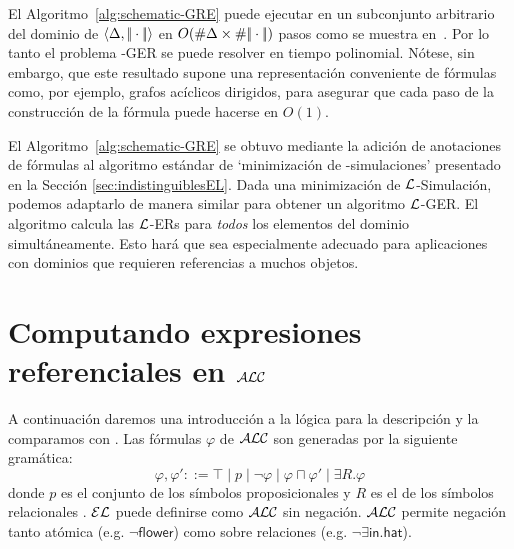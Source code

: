 


El Algoritmo~\ref{alg:schematic-GRE} puede ejecutar en un subconjunto arbitrario del dominio de $\langle \Delta,|\!|\cdot|\!| \rangle$
 en $O(\# \Delta\times\# |\!|\cdot|\!|)$ pasos como se muestra en~\cite{HHK95}. Por lo tanto el problema \EL-GER se puede resolver en tiempo polinomial. N\'otese, sin embargo, que este resultado supone una representaci\'on conveniente de
f\'ormulas como, por ejemplo, grafos ac\'iclicos dirigidos, para asegurar que
cada paso de la construcci\'on de la f\'ormula puede hacerse en $O(1)$. %

El Algoritmo~\ref{alg:schematic-GRE} se obtuvo mediante la adici\'on de anotaciones de f\'ormulas
al algoritmo est\'andar de `minimizaci\'on de \EL-simulaciones' presentado en la Secci\'on \ref{sec:indistinguiblesEL}. Dada una minimizaci\'on de
$\mathcal{L}$-Simulaci\'on, podemos adaptarlo de
manera similar para obtener un algoritmo $\mathcal{L}$-GER.
El algoritmo calcula las $\mathcal{L}$-ERs para \emph{todos} los elementos del
dominio simult\'aneamente.
Esto har\'a que sea especialmente adecuado para aplicaciones con
dominios que requieren referencias a muchos objetos.

\section{Computando expresiones referenciales en $\mathcal{ALC}$}
\label{sec:bisimulacion}

%

A continuaci\'on daremos una introducci\'on a la l\'ogica para la descripci\'on \alc y la comparamos con \el. Las f\'ormulas $\varphi$ de $\mathcal{ALC}$ son generadas por la siguiente gram\'atica:
$$
\varphi,\varphi' ::= \top \mid p \mid \neg \varphi \mid \varphi \sqcap \varphi'
\mid \exists R. \varphi
$$
donde $p$ es el conjunto de los s\'imbolos proposicionales \prop y $R$ es el de los s\'imbolos relacionales \rel. $\mathcal{EL}$ puede definirse como $\mathcal{ALC}$ sin negaci\'on. $\mathcal{ALC}$ permite negaci\'on tanto at\'omica (e.g. $\neg \mathsf{flower}$) como sobre relaciones (e.g. $\neg \exists \mathsf{in}.\mathsf{hat}$).

